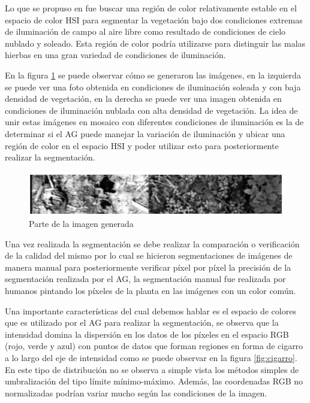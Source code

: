 \documentclass[conference,compsoc]{IEEEtran}
\begin{document}
Lo que se propuso en\cite{algen} fue buscar una región de color relativamente estable en el espacio de color HSI para segmentar la vegetación bajo dos condiciones extremas de iluminación de campo al aire libre como resultado de condiciones de cielo nublado y soleado. Esta región de color podría utilizarse para distinguir las malas hierbas en una gran variedad de condiciones de iluminación.

En la figura \ref{fig:genmosaico} se puede observar cómo se generaron las imágenes, en la izquierda se puede ver una foto obtenida en condiciones de iluminación soleada y con baja densidad de vegetación, en la derecha se puede ver una imagen obtenida en condiciones de iluminación nublada con alta densidad de vegetación. La idea de unir estas imágenes en mosaico con diferentes condiciones de iluminación es la de determinar si el AG puede manejar la variación de iluminación y ubicar una región de color en el espacio HSI y poder utilizar esto para posteriormente realizar la segmentación.

\begin{figure}[H]
\centering
\includegraphics[scale=0.5]{genmosaico.png}
\caption{\label{fig:genmosaico}Parte de la imagen generada}
\end{figure}
 
Una vez realizada la segmentación se debe realizar la comparación o verificación de la calidad del mismo por lo cual se hicieron segmentaciones de imágenes de manera manual para posteriormente verificar píxel por píxel la precisión de la segmentación realizada por el AG, la segmentación manual fue realizada por humanos pintando los píxeles de la planta en las imágenes con un color común.
 
Una importante características del cual debemos hablar es el espacio de colores que es utilizado por el AG para realizar la segmentación, se observa que la intensidad domina la dispersión en los datos de los píxeles en el espacio RGB (rojo, verde y azul) con puntos de datos que forman regiones en forma de cigarro a lo largo del eje de intensidad como se puede observar en la figura \ref{fig:cigarro}. En este tipo de distribución no se observa a simple vista los métodos simples de umbralización del tipo límite mínimo-máximo. Además, las coordenadas RGB no normalizadas podrían variar mucho según las condiciones de la imagen.
\end{document}

